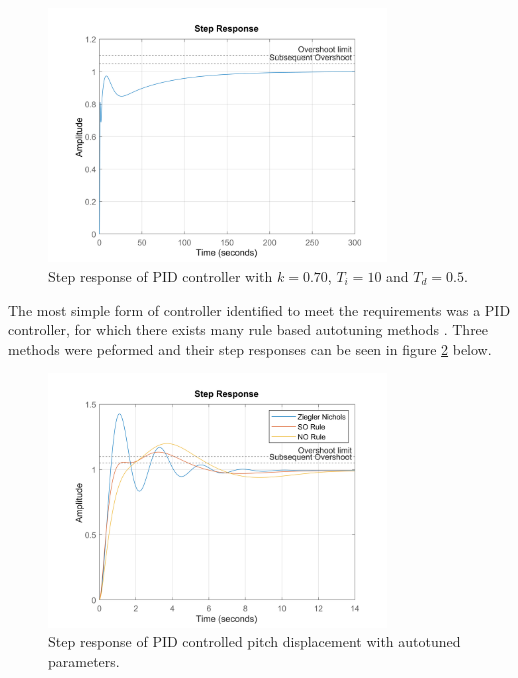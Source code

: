 \documentclass{article}
\begin{document}
\begin{figure}[H]
    \centering
    \includegraphics[width=0.8\textwidth]{figures/pitch_autopilot_compensated_step.png}
    \caption{Step response of PID controller with $k=0.70$, $T_i = 10$ and $T_d = 0.5$.}
    \label{fig:pitch_autopilot_compensated_step}
\end{figure}

The most simple form of controller identified to meet the requirements was a PID controller, for which
there exists many rule based autotuning methods \cite{autotune}.
Three methods were peformed and their step responses can be seen in figure \ref{fig:pitch_autopilot_autotune_step} below.

\begin{figure}[H]
    \centering
    \includegraphics[width=0.8\textwidth]{figures/pitch_autopilot_autotuning_comparison.png}
    \caption{Step response of PID controlled pitch displacement with autotuned parameters.}
    \label{fig:pitch_autopilot_autotune_step}
\end{figure}
\end{document}
